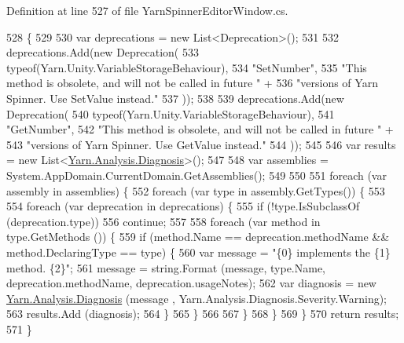 Definition at line 527 of file Yarn\-Spinner\-Editor\-Window.\-cs.


\begin{DoxyCode}
528         \{
529 
530             var deprecations = \textcolor{keyword}{new} List<Deprecation>();
531 
532             deprecations.Add(\textcolor{keyword}{new} Deprecation(
533                 typeof(Yarn.Unity.VariableStorageBehaviour),
534                 \textcolor{stringliteral}{"SetNumber"},
535                 \textcolor{stringliteral}{"This method is obsolete, and will not be called in future "} +
536                 \textcolor{stringliteral}{"versions of Yarn Spinner. Use SetValue instead."}
537             ));
538 
539             deprecations.Add(\textcolor{keyword}{new} Deprecation(
540                 typeof(Yarn.Unity.VariableStorageBehaviour),
541                 \textcolor{stringliteral}{"GetNumber"},
542                 \textcolor{stringliteral}{"This method is obsolete, and will not be called in future "} +
543                 \textcolor{stringliteral}{"versions of Yarn Spinner. Use GetValue instead."}
544             ));
545 
546             var results = \textcolor{keyword}{new} List<\hyperlink{a00093}{Yarn.Analysis.Diagnosis}>();
547 
548             var assemblies = System.AppDomain.CurrentDomain.GetAssemblies();
549 
550 
551             \textcolor{keywordflow}{foreach} (var assembly \textcolor{keywordflow}{in} assemblies) \{
552                 \textcolor{keywordflow}{foreach} (var type \textcolor{keywordflow}{in} assembly.GetTypes()) \{
553 
554                     \textcolor{keywordflow}{foreach} (var deprecation \textcolor{keywordflow}{in} deprecations) \{
555                         \textcolor{keywordflow}{if} (!type.IsSubclassOf (deprecation.type))
556                             \textcolor{keywordflow}{continue};
557 
558                         \textcolor{keywordflow}{foreach} (var method \textcolor{keywordflow}{in} type.GetMethods ()) \{
559                             \textcolor{keywordflow}{if} (method.Name == deprecation.methodName && method.DeclaringType == type) \{
560                                 var message = \textcolor{stringliteral}{"\{0\} implements the \{1\} method. \{2\}"};
561                                 message = string.Format (message, type.Name, deprecation.methodName, 
      deprecation.usageNotes);
562                                 var diagnosis = \textcolor{keyword}{new} \hyperlink{a00093}{Yarn.Analysis.Diagnosis} (message
      , Yarn.Analysis.Diagnosis.Severity.Warning);
563                                 results.Add (diagnosis);
564                             \}
565                         \}
566 
567                     \}
568                 \}
569             \}
570             \textcolor{keywordflow}{return} results;
571         \}
\end{DoxyCode}
